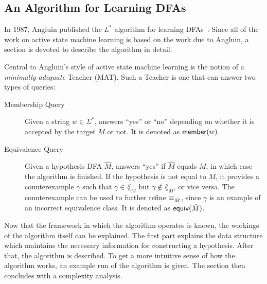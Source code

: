 \subsection{An Algorithm for Learning DFAs}
\label{sec:an-algor-learn}
In 1987, Angluin published the $L^*$ algorithm for learning
DFAs~\cite{Angluin1987}. Since all of the work on active state machine learning is
based on the work due to Angluin, a section is devoted to describe the algorithm
in detail.

Central to Angluin's style of active state machine learning is the notion of a
\textit{minimally adequate} Teacher (MAT). Such a Teacher is one that can answer
two types of queries:

\begin{description}
\item[Membership Query] Given a string $w \in \Sigma^*$, answers ``yes'' or
  ``no'' depending on whether it is accepted by the target $M$ or not. It is
  denoted as $\mathsf{member}(w)$.
\item[Equivalence Query] Given a hypothesis DFA $\hat M$, answers ``yes'' if
  $\hat M$ equals $M$, in which case the algorithm is finished. If the
  hypothesis is not equal to $M$, it provides a counterexample $\gamma$ such
  that $\gamma \in \lang_M$ but $\gamma \not\in \lang_{\hat M}$, or vice
  versa. The counterexample can be used to further refine $\equiv_{\hat M}$,
  since $\gamma$ is an example of an incorrect equivalence class. It is denoted
  as $\mathsf{equiv}(\hat M)$.
\end{description}

Now that the framework in which the algorithm operates is known, the workings of
the algorithm itself can be explained. The first part explains the data
structure which maintains the necessary information for constructing a
hypothesis. After that, the algorithm is described. To get a more intuitive
sense of how the algorithm works, an example run of the algorithm is given. The
section then concludes with a complexity analysis.

